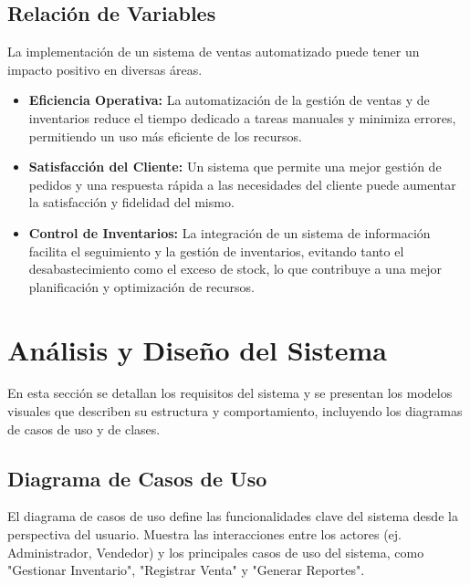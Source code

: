 \documentclass[conference]{IEEEtran}
\begin{document}
\subsection{Relación de Variables}
La implementación de un sistema de ventas automatizado puede tener un impacto positivo en diversas áreas.
\begin{itemize}
    \item \textbf{Eficiencia Operativa:} La automatización de la gestión de ventas y de inventarios reduce el tiempo dedicado a tareas manuales y minimiza errores, permitiendo un uso más eficiente de los recursos.
    \item \textbf{Satisfacción del Cliente:} Un sistema que permite una mejor gestión de pedidos y una respuesta rápida a las necesidades del cliente puede aumentar la satisfacción y fidelidad del mismo.
    \item \textbf{Control de Inventarios:} La integración de un sistema de información facilita el seguimiento y la gestión de inventarios, evitando tanto el desabastecimiento como el exceso de stock, lo que contribuye a una mejor planificación y optimización de recursos.
\end{itemize}

\section{Análisis y Diseño del Sistema}
En esta sección se detallan los requisitos del sistema y se presentan los modelos visuales que describen su estructura y comportamiento, incluyendo los diagramas de casos de uso y de clases.

\subsection{Diagrama de Casos de Uso}
El diagrama de casos de uso define las funcionalidades clave del sistema desde la perspectiva del usuario. Muestra las interacciones entre los actores (ej. Administrador, Vendedor) y los principales casos de uso del sistema, como "Gestionar Inventario", "Registrar Venta" y "Generar Reportes".
\end{document}
